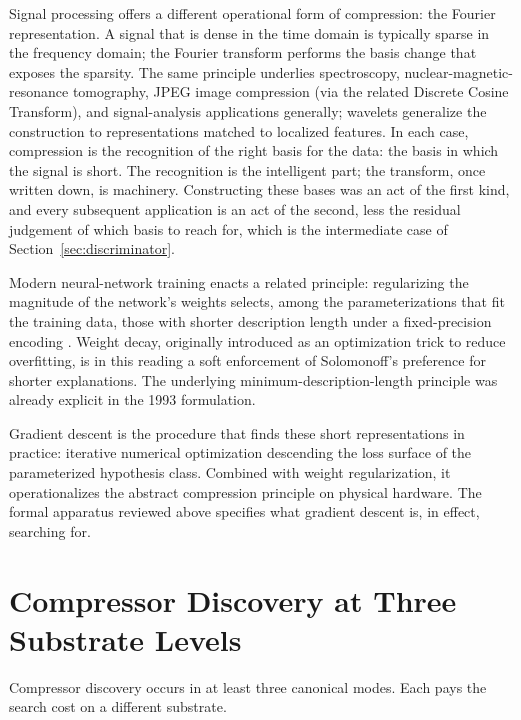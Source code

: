 \documentclass[11pt]{article}
\begin{document}
Signal processing offers a different operational form of compression: the Fourier representation. A signal that is dense in the time domain is typically sparse in the frequency domain; the Fourier transform performs the basis change that exposes the sparsity. The same principle underlies spectroscopy, nuclear-magnetic-resonance tomography, JPEG image compression (via the related Discrete Cosine Transform), and signal-analysis applications generally; wavelets generalize the construction to representations matched to localized features. In each case, compression is the recognition of the right basis for the data: the basis in which the signal is short. The recognition is the intelligent part; the transform, once written down, is machinery. Constructing these bases was an act of the first kind, and every subsequent application is an act of the second, less the residual judgement of which basis to reach for, which is the intermediate case of Section~\ref{sec:discriminator}.

Modern neural-network training enacts a related principle: regularizing the magnitude of the network's weights selects, among the parameterizations that fit the training data, those with shorter description length under a fixed-precision encoding \citep{hinton_vancamp_1993}. Weight decay, originally introduced as an optimization trick to reduce overfitting, is in this reading a soft enforcement of Solomonoff's preference for shorter explanations. The underlying minimum-description-length principle was already explicit in the 1993 formulation.

Gradient descent is the procedure that finds these short representations in practice: iterative numerical optimization \citep{mudrov1991} descending the loss surface of the parameterized hypothesis class. Combined with weight regularization, it operationalizes the abstract compression principle on physical hardware. The formal apparatus reviewed above specifies what gradient descent is, in effect, searching for.

\section{Compressor Discovery at Three Substrate Levels}\label{sec:substrates}

Compressor discovery occurs in at least three canonical modes. Each pays the search cost on a different substrate.
\end{document}
